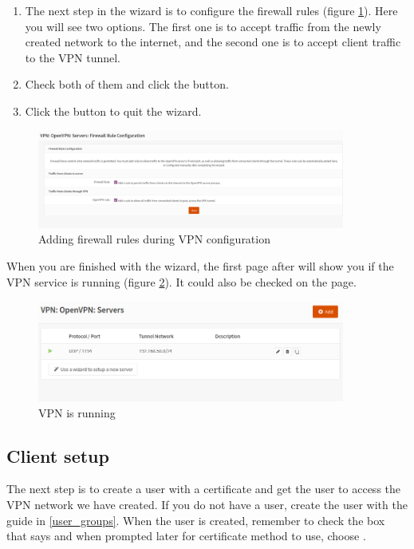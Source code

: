 {\begin{enumerate}
\begin{enumerate}
        \item Click on .
    \end{enumerate}
    \item The next step in the wizard is to configure the firewall rules (figure \ref{opnsense:vpn_rules}). Here you will see two options. The first one is to accept traffic from the newly created network to the internet, and the second one is to accept client traffic to the VPN tunnel.
    \item Check both of them and click the  button.
    \item Click the  button to quit the wizard.
\end{enumerate}}

\begin{figure}[h!]
    \centering
    \includegraphics[width=0.9\textwidth]{Images/vpn/firewall_rules.PNG}
    \caption{Adding firewall rules during VPN configuration}
    \label{opnsense:vpn_rules}
\end{figure}

When you are finished with the wizard, the first page after will show you if the VPN service is running (figure \ref{opnsense:vpn_running}). It could also be checked on the  page.

\begin{figure}[h!]
    \centering
    \includegraphics[width=0.9\textwidth]{Images/vpn/vpn.PNG}
    \caption{VPN is running}
    \label{opnsense:vpn_running}
\end{figure}


\subsection{Client setup}
The next step is to create a user with a certificate and get the user to access the VPN network we have created. If you do not have a user, create the user with the guide in \ref{user_groups}. When the user is created, remember to check the box that says  and when prompted later for certificate method to use, choose .

